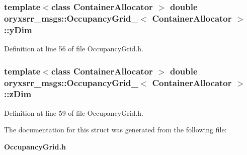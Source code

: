 \subsubsection[{y\-Dim}]{\setlength{\rightskip}{0pt plus 5cm}template$<$class Container\-Allocator $>$ double {\bf oryxsrr\-\_\-msgs\-::\-Occupancy\-Grid\-\_\-}$<$ \-Container\-Allocator $>$\-::{\bf y\-Dim}}\label{structoryxsrr__msgs_1_1OccupancyGrid___ac2f6eb18d9c9edc53fe0f583d5ef23e2}


\-Definition at line 56 of file \-Occupancy\-Grid.\-h.

\subsubsection[{z\-Dim}]{\setlength{\rightskip}{0pt plus 5cm}template$<$class Container\-Allocator $>$ double {\bf oryxsrr\-\_\-msgs\-::\-Occupancy\-Grid\-\_\-}$<$ \-Container\-Allocator $>$\-::{\bf z\-Dim}}\label{structoryxsrr__msgs_1_1OccupancyGrid___a5f2010670fa04c9e42dae17084e798a5}


\-Definition at line 59 of file \-Occupancy\-Grid.\-h.



\-The documentation for this struct was generated from the following file\-:\begin{DoxyCompactItemize}
\item 
{\bf \-Occupancy\-Grid.\-h}\end{DoxyCompactItemize}

